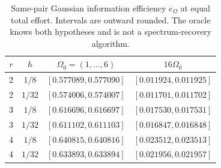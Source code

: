 \begin{table}[tb]
\centering
\caption{Same-pair Gaussian information efficiency $e_\Omega$ at equal total effort. Intervals are outward rounded. The oracle knows both hypotheses and is not a spectrum-recovery algorithm.}\label{tab:efficiency}
\begin{tabular}{cccc}\toprule
$r$ & $h$ & $\Omega_0=(1,\ldots,6)$ & $16\Omega_0$ \\\midrule
2 & $1/8$ & $[0.577089, 0.577090]$ & $[0.011924, 0.011925]$ \\
2 & $1/32$ & $[0.574006, 0.574007]$ & $[0.011701, 0.011702]$ \\
3 & $1/8$ & $[0.616696, 0.616697]$ & $[0.017530, 0.017531]$ \\
3 & $1/32$ & $[0.611102, 0.611103]$ & $[0.016847, 0.016848]$ \\
4 & $1/8$ & $[0.640815, 0.640816]$ & $[0.023512, 0.023513]$ \\
4 & $1/32$ & $[0.633893, 0.633894]$ & $[0.021956, 0.021957]$ \\
\bottomrule\end{tabular}
\end{table}
